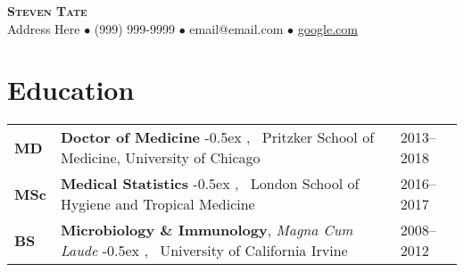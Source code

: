 \documentclass[letterpaper]{article}
\newcommand{\name}{Steven Tate}        %
\newcommand{\Indent}{\hspace{0.30cm}}  %
\newcommand{\newlinea}{\kern-0.5ex , \ } %
\begin{document}

\begin{center}
{\bfseries\huge\scshape\name} \\ 
Address Here
  $\bullet$ (999) 999-9999 
  $\bullet$ email@email.com
  $\bullet$ \href{website}{google.com}
\\
\end{center}



\section*{Education \hrulefill}
\begin{tabular}{L{1.0cm} L{13.0cm} R{2.0cm}}

\textbf{MD} 
  & \textbf{Doctor of Medicine}
     \newlinea Pritzker School of Medicine, University of Chicago
  & 2013--2018 \\

\textbf{MSc} 
  & \textbf{Medical Statistics}
     \newlinea London School of Hygiene and Tropical Medicine
  & 2016--2017 \\

\textbf{BS} 
  & \textbf{Microbiology \& Immunology}, \textit{Magna Cum Laude}
    \newlinea University of California Irvine
  & 2008--2012 \\

\end{tabular}


\end{document}
